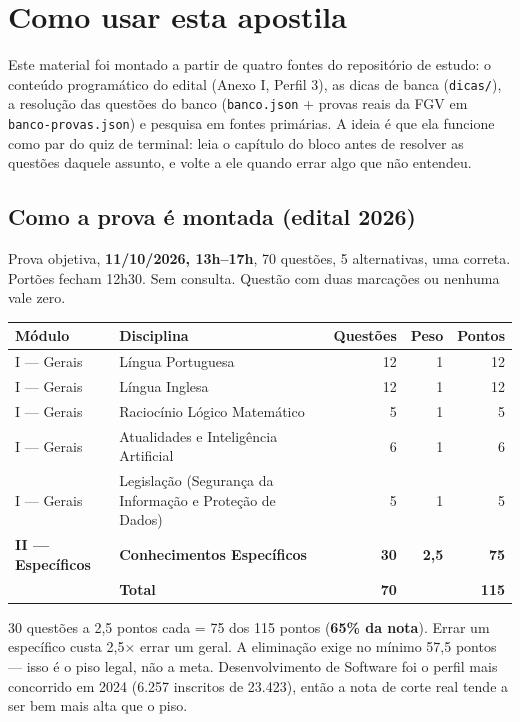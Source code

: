 \chapter{Como usar esta apostila}

Este material foi montado a partir de quatro fontes do repositório de estudo: o
conteúdo programático do edital (Anexo I, Perfil 3), as dicas de banca
(\texttt{dicas/}), a resolução das questões do banco (\texttt{banco.json} +
provas reais da FGV em \texttt{banco-provas.json}) e pesquisa em fontes
primárias. A ideia é que ela funcione como par do quiz de terminal: leia o
capítulo do bloco antes de resolver as questões daquele assunto, e volte a ele
quando errar algo que não entendeu.

\section*{Como a prova é montada (edital 2026)}

Prova objetiva, \textbf{11/10/2026, 13h--17h}, 70 questões, 5 alternativas,
uma correta. Portões fecham 12h30. Sem consulta. Questão com duas marcações ou
nenhuma vale zero.

\begin{center}
\begin{tabular}{@{}p{2.2cm}p{5.2cm}rrr@{}}
\toprule
\textbf{Módulo} & \textbf{Disciplina} & \textbf{Questões} & \textbf{Peso} & \textbf{Pontos} \\
\midrule
I --- Gerais & Língua Portuguesa & 12 & 1 & 12 \\
I --- Gerais & Língua Inglesa & 12 & 1 & 12 \\
I --- Gerais & Raciocínio Lógico Matemático & 5 & 1 & 5 \\
I --- Gerais & Atualidades e Inteligência Artificial & 6 & 1 & 6 \\
I --- Gerais & Legislação (Segurança da Informação e Proteção de Dados) & 5 & 1 & 5 \\
\textbf{II --- Específicos} & \textbf{Conhecimentos Específicos} & \textbf{30} & \textbf{2,5} & \textbf{75} \\
\midrule
& \textbf{Total} & \textbf{70} & & \textbf{115} \\
\bottomrule
\end{tabular}
\end{center}

\begin{conceito}
30 questões a 2,5 pontos cada = 75 dos 115 pontos (\textbf{65\% da nota}).
Errar um específico custa 2,5$\times$ errar um geral. A eliminação exige no
mínimo 57,5 pontos --- isso é o piso legal, não a meta. Desenvolvimento de
Software foi o perfil mais concorrido em 2024 (6.257 inscritos de 23.423), então
a nota de corte real tende a ser bem mais alta que o piso.
\end{conceito}


